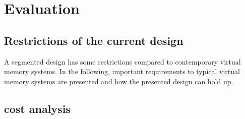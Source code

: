 \chapter{Evaluation}



\section{Restrictions of the current design}
A segmented design has some restrictions compared to contemporary virtual memory
systems. In the following, important requirements to typical virtual memory
systems are presented and how the presented design can hold up.






\label{chap:eval}




\section{cost analysis}
